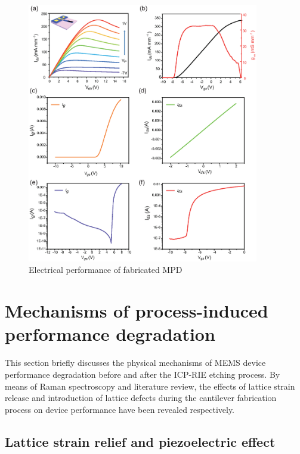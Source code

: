 \begin{figure}[H] 
\centering    
\includegraphics[width=0.9\textwidth]{performancempd}
\caption[Electrical performance of fabricated MPD]{Electrical performance of fabricated  MPD}
\label{fig:performancempd}
\end{figure}

\section{Mechanisms of process-induced performance degradation}

This  section briefly discusses the physical mechanisms  of MEMS device performance degradation  before and after the ICP-RIE  etching process. By means of Raman spectroscopy  and literature review, the effects of lattice strain  release and introduction of lattice defects  during the cantilever  fabrication process on device performance have been revealed respectively.

\subsection{Lattice strain relief and piezoelectric effect}

